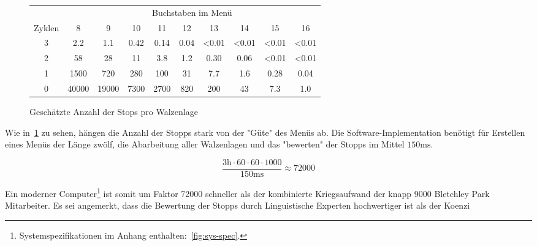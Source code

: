 \newpage
\begin{figure}[htbp]
	\centering
	\caption{Geschätzte Anzahl der Stops pro Walzenlage~\autocite{enwiki:bombe}}
	\label{fig:num-stops}
	\begin{tabular}{|c||c|c|c|c|c|c|c|c|c|}
		\hline
		& \multicolumn{9}{c|}{Buchstaben im Menü} \\
		Zyklen & 8 & 9 & 10 & 11 & 12 & 13 & 14 & 15 & 16 \\
		\hhline{|=||=|=|=|=|=|=|=|=|=|}
		3 & 2.2  & 1.1  & 0.42  & 0.14  & 0.04  & <0.01  & <0.01  & <0.01  & <0.01 \\
		\hline
		2 & 58  & 28  & 11  & 3.8  & 1.2  & 0.30  & 0.06  & <0.01  & <0.01  \\
		\hline
		1 & 1500  & 720  & 280  & 100  & 31  & 7.7  & 1.6  & 0.28  & 0.04  \\
		\hline
		0 & 40000  & 19000  & 7300  & 2700  & 820  & 200  & 43  & 7.3  & 1.0  \\
		\hline
	\end{tabular}
\end{figure}


Wie in~\cref{fig:num-stops} zu sehen, hängen die Anzahl der Stopps stark von der "Güte" des Menüs ab.
Die Software-Implementation benötigt für Erstellen eines Menüs der Länge zwölf, die Abarbeitung aller Walzenlagen und das "bewerten" der Stopps im Mittel
$150\si{\ms}$.

\[
\frac{3\si{\hour} \cdot 60 \cdot 60 \cdot 1000}{150\si{\ms}} \approx 72000
\]

Ein moderner Computer\footnote{Systemspezifikationen im Anhang enthalten:~\cref{fig:sys-spec}.} ist somit um Faktor 72000 schneller als der kombinierte Kriegsaufwand der knapp 9000 Bletchley Park Mitarbeiter.
Es sei angemerkt, dass die Bewertung der Stopps durch Linguistische Experten hochwertiger ist als der Koenzi

